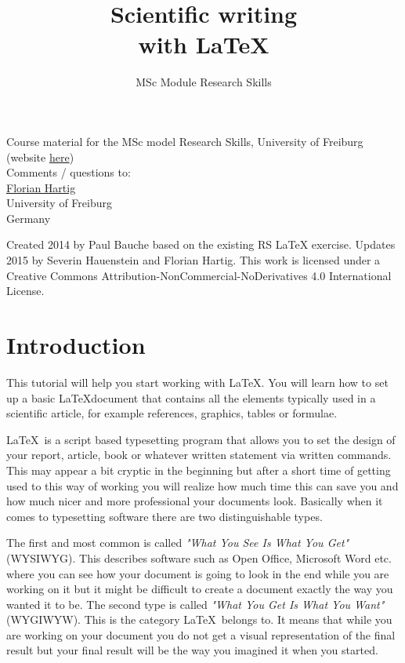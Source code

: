 \documentclass[]{tufte-book} %
\title{Scientific writing\\with LaTeX}
\author{MSc Module Research Skills}
\begin{document}
\let\cleardoublepage\clearpage
\maketitle

\thispagestyle{empty}
\null


\begin{fullwidth}
Course material for the MSc model Research Skills, University of Freiburg (website \href{http://florianhartig.github.io/ResearchSkills/}{here})\\[0.5cm]
Comments / questions to:\\[0.5cm]
\href{https://florianhartig.wordpress.com/}{Florian Hartig}\\
University of Freiburg\\
Germany


\end{fullwidth}


\vfill
\begin{fullwidth}
Created 2014 by Paul Bauche based on the existing RS LaTeX exercise. Updates 2015 by Severin Hauenstein and Florian Hartig. This work is licensed under a Creative Commons Attribution-NonCommercial-NoDerivatives 4.0 International License.
\end{fullwidth}

\tableofcontents

\chapter{Introduction}

This tutorial will help you start working with \LaTeX. You will learn how to set up a basic  \LaTeX document that contains all the elements typically used in a scientific article, for example references, graphics, tables or formulae. 

 \LaTeX\ is a script based typesetting program that allows you to set the design of your report, article, book or whatever written statement via written commands. This may appear a bit cryptic in the beginning but after a short time of getting used to this way of working you will realize how much time this can save you and how much nicer and more professional your documents look. Basically when it comes to typesetting software there are two distinguishable types.
 
The first and most common is called \emph{"What You See Is What You Get"} (WYSIWYG). This describes software such as Open Office, Microsoft Word etc. where you can see how your document is going to look in the end while you are working on it but it might be difficult to create a document exactly the way you wanted it to be. The second type is called \emph{"What You Get Is What You Want"}(WYGIWYW). This is the category \LaTeX\ belongs to. It means that while you are working on your  document you do not get a visual representation of the final result but your final result will be the way you imagined it when you started.  	
\end{document}

